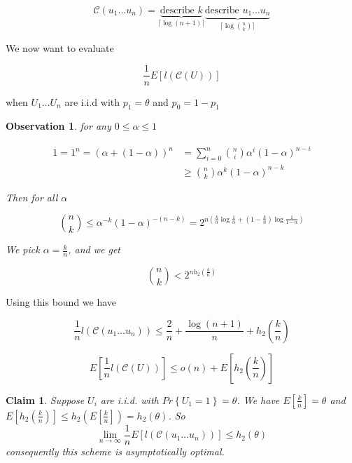 \documentclass[twoside]{article}
\newtheorem{claim}{Claim}[section]
\newtheorem{observation}{Observation}[section]
\theoremstyle{definition} %
\renewcommand{\Pr}[1]{Pr\left\{#1\right\}}
\newcommand{\Ex}[1]{E\left[#1\right]}
\newcommand{\pfrac}[2]{\left( \frac{#1}{#2} \right)}
\def\C{\mathcal{C}}
\begin{document}
\[
  \C(u_1 \dots u_n) =
  \underbrace{\text{describe } k}_{\lceil \log (n+1)\rceil}
  \underbrace{\text{describe } u_1 \dots u_n}_{\lceil \log {n \choose k}\rceil}
\]

We now want to evaluate

\[
  \frac 1 n \Ex{l(\C(U))}
\]

when $U_1 \dots U_n$ are i.i.d with $p_1 = \theta$ and $p_0 = 1 - p_1$

\begin{observation}

for any $0 \leq \alpha \leq 1$

\begin{align*}
  1 = 1^n = (\alpha + (1-\alpha))^n &= \sum_{i=0}^n {n \choose i} \alpha^i (1-\alpha)^{n-i}\\
  & \geq {n \choose k} \alpha^k (1-\alpha)^{n-k}
\end{align*}

Then for all $\alpha$

\[
{n \choose k} \leq \alpha^{-k}(1-\alpha)^{-(n-k)} = 2^{n(\frac k n \log \frac 1 \alpha + (1-\frac k n) \log \frac 1 {1-\alpha})}
\]

We pick $\alpha = \frac k n$, and we get

\[
  {n \choose k} < 2^{n h_2 \pfrac k n}
\]

\end{observation}

Using this bound we have

\[
  \frac 1 n l(\C(u_1 \dots u_n)) \leq \frac 2 n + \frac {\log (n+1)} n + h_2\pfrac k n
\]

\[
  \Ex{\frac 1 n l(\C(U))} \leq o(n) + \Ex{h_2 \pfrac k n}
\]

\begin{claim}
Suppose $U_i$ are i.i.d. with $\Pr{U_1=1}=\theta$. We have $\Ex{ \frac k n} = \theta$ and $\Ex{h_2 \pfrac k n } \leq h_2(\Ex{\frac k n}) = h_2(\theta)$. So
\[
  \lim_{n\to \infty} \frac 1 n \Ex{l(\C(u_1\dots u_n))} \leq h_2(\theta)
\]
consequently this scheme is asymptotically optimal.
\end{claim}
\end{document}
